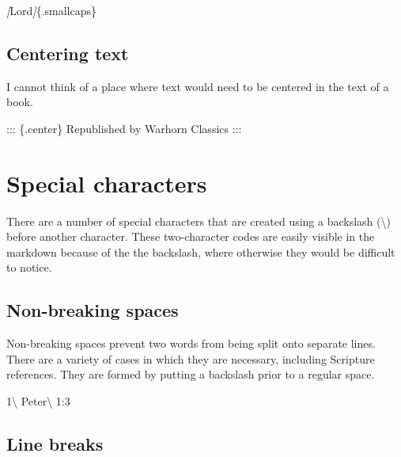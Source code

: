 \documentclass[
]{book}
\newenvironment{Shaded}{\begin{snugshade}}{\end{snugshade}}
\newcommand{\CommentTok}[1]{\textcolor[rgb]{0.56,0.35,0.01}{\textit{#1}}}
\newcommand{\NormalTok}[1]{#1}
\newcommand{\OtherTok}[1]{\textcolor[rgb]{0.56,0.35,0.01}{#1}}
\begin{document}
\begin{Shaded}
\begin{Highlighting}[]
\CommentTok{[}\OtherTok{Lord}\CommentTok{]}\NormalTok{\{.smallcaps\}}
\end{Highlighting}
\end{Shaded}

\hypertarget{centering-text}{%
\section{Centering text}\label{centering-text}}

I cannot think of a place where text would need to be centered in the text of a book.

\begin{Shaded}
\begin{Highlighting}[]
\NormalTok{::: \{.center\}}
\NormalTok{Republished by Warhorn Classics}
\NormalTok{:::}
\end{Highlighting}
\end{Shaded}

\hypertarget{special-characters}{%
\chapter{Special characters}\label{special-characters}}

There are a number of special characters that are created using a backslash (\textbackslash) before another character. These two-character codes are easily visible in the markdown because of the the backslash, where otherwise they would be difficult to notice.

\hypertarget{non-breaking-spaces}{%
\section{Non-breaking spaces}\label{non-breaking-spaces}}

Non-breaking spaces prevent two words from being split onto separate lines. There are a variety of cases in which they are necessary, including Scripture references. They are formed by putting a backslash prior to a regular space.

\begin{Shaded}
\begin{Highlighting}[]
\NormalTok{1\textbackslash{} Peter\textbackslash{} 1:3 }
\end{Highlighting}
\end{Shaded}

\hypertarget{line-breaks}{%
\section{Line breaks}\label{line-breaks}}
\end{document}
